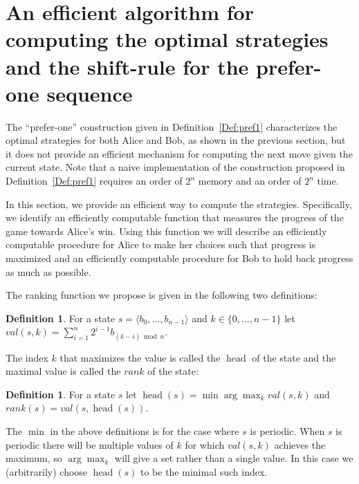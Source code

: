 \documentclass[final,12pt]{elsarticle}
\theoremstyle{definition} \newtheorem{definition}[theorem]{Definition} \newtheorem{observation}[theorem]{Observation} \newtheorem{example}[theorem]{Example} \newtheorem{remark}[theorem]{Remark} \newtheorem{corrolary}[theorem]{Corrolary}
\newcommand{\REF}[2]{#1~\ref{#2}}
\newcommand{\T}[1]{\langle{#1}\rangle}
\DeclareMathOperator{\head}{head}
\begin{document}
\section{An efficient algorithm for computing the optimal strategies and the shift-rule for the prefer-one sequence}
\label{sec:efficient-optimal}

The ``prefer-one'' construction given in \REF{Definition}{Def:pref1} characterizes the optimal strategies for both Alice and Bob, as shown in the previous section, but it does not provide an efficient mechanism for computing the next move given the current state. Note that a naive implementation of the construction proposed in \REF{Definition}{Def:pref1} requires an order of $2^n$ memory and an order of $2^n$ time. 

In this section, we provide an efficient way to compute the strategies. Specifically, we identify an efficiently computable function that measures the progress of the game towards Alice's win. Using this function we will describe an efficiently computable procedure for Alice to make her choices such that progress is maximized and an efficiently computable procedure for Bob to hold back progress as much as possible.

The ranking function we propose is given in the following two definitions:

\begin{definition}
	For a state $s=\T{b_0,\dots,b_{n-1}}$ and $k \in \{0,\dots,n-1\}$ let  $val(s,k)=\sum_{i=1}^{n}  2^{i-1}b_{(k-i) \bmod n}$.
\end{definition}
The index $k$ that maximizes the value is called the $\head$ of the state and the maximal value is called the $rank$ of the state:
\begin{definition}
	For a state $s$ let  $\head(s)=\min \arg \max_k val(s,k)$ and $rank(s)=val(s,\head(s))$. 
\end{definition}

The $\min$ in the above definitions is for the case where $s$ is periodic. When $s$ is periodic there will be multiple values of $k$ for which $val(s,k)$ achieves the maximum, so $\arg \max_k$ will give a set rather than a single value. In this case we (arbitrarily) choose $\head(s)$ to be the minimal such index.
\end{document}
